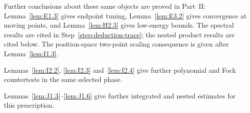 \begin{remark}
Further conclusions about these same objects are proved in Part~II: Lemma~\ref{lem:E1.3} gives endpoint tuning, Lemma~\ref{lem:E3.2} gives convergence at moving points, and Lemma~\ref{lem:H2.3} gives low-energy bounds. The spectral results are cited in Step~\ref{step:deduction-trace}; the nested product results are cited below. The position-space two-point scaling consequence is given after Lemma~\ref{lem:I1.3}.

Lemmas~\ref{lem:I2.2}, \ref{lem:I2.3} and~\ref{lem:I2.4} give further polynomial and Fock countertests in the same selected phase.

Lemmas~\ref{lem:J1.3}--\ref{lem:J1.6} give further integrated and nested estimates for this prescription.
\end{remark}
